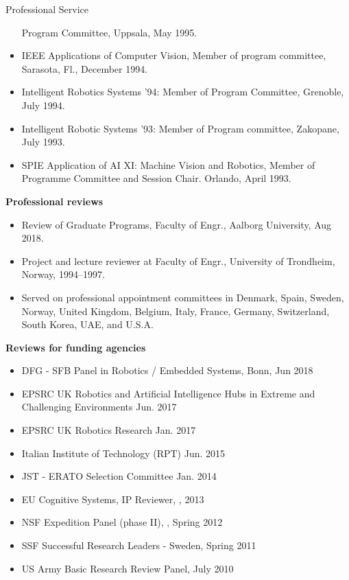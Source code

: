 \documentclass{article}
\begin{document}
\begin{cv}
\begin{cvlist}{Professional Service}
\begin{itemize}
    Program Committee, Uppsala, May 1995.
  \item IEEE Applications of Computer Vision, Member of program
    committee, Sarasota, Fl., December 1994.
  \item Intelligent Robotics Systems '94: Member of Program Committee,
    Grenoble, July 1994.
  \item Intelligent Robotic Systems '93: Member of Program committee,
    Zakopane, July 1993.
  \item SPIE Application of AI XI: Machine Vision and Robotics, Member
    of Programme Committee and Session Chair. Orlando, April 1993.
\end{itemize}

\item {\bf Professional reviews}
  \begin{itemize}
  \item Review of Graduate Programs, Faculty of Engr., Aalborg University, Aug 2018.
  \item Project and lecture reviewer at Faculty of Engr., University of Trondheim, Norway, 1994--1997.
  \item Served on professional appointment committees in Denmark, Spain, Sweden, Norway, United Kingdom, Belgium, Italy, France,
    Germany, Switzerland, South Korea, UAE, and U.S.A.
  \end{itemize}
\item {\bf Reviews for funding agencies}
  \begin{itemize}
  \item DFG - SFB Panel in Robotics / Embedded Systems,
    Bonn,\cftdotfill{\cftdotsep} Jun 2018
  \item EPSRC UK Robotics and Artificial Intelligence Hubs in Extreme
    and Challenging Environments \cftdotfill{\cftdotsep} Jun. 2017
  \item EPSRC UK Robotics Research  \cftdotfill{\cftdotsep} Jan. 2017
  \item Italian Institute of Technology (RPT) \cftdotfill{\cftdotsep}
    Jun. 2015
 \item JST - ERATO Selection Committee \cftdotfill{\cftdotsep} Jan. 2014
 \item EU Cognitive Systems, IP Reviewer, \cftdotfill{\cftdotsep}, 2013
 \item NSF Expedition Panel (phase II), \cftdotfill{\cftdotsep},
   Spring 2012
 \item SSF Successful Research Leaders - Sweden,
   \cftdotfill{\cftdotsep} Spring 2011
 \item US Army Basic Research Review Panel, \cftdotfill{\cftdotsep} July 2010

\end{itemize}
\end{cvlist}
\end{cv}
\end{document}
